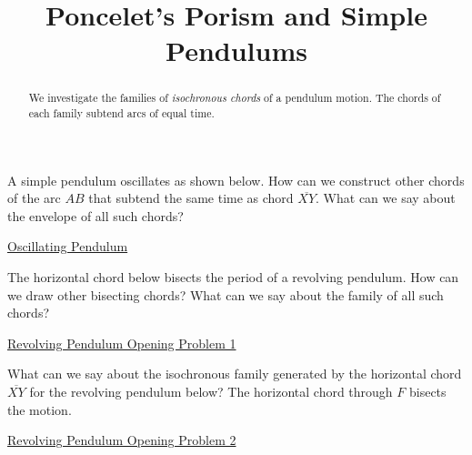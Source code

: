 \documentclass{ximera}
\title{Poncelet's Porism and Simple Pendulums}
\begin{document}
\begin{abstract}
We investigate the families of \emph{isochronous chords} of a pendulum motion. The chords of each family subtend arcs of equal time.
\end{abstract}
\maketitle





\begin{exploration}
A simple pendulum oscillates as shown below. How can we construct other chords of the arc $AB$ that subtend the same time as chord $\overline{XY}$. What can we say about the envelope of all such chords?

\begin{onlineOnly}
    \begin{center}
\end{center}
\end{onlineOnly}

\href{https://www.desmos.com/calculator/pleca0vkjw}{Oscillating Pendulum}

\end{exploration}

\begin{exploration}
The horizontal chord below bisects the period of a revolving pendulum. How can we draw other bisecting chords? What can we say about the family of all such chords?

\begin{onlineOnly}
    \begin{center}
\end{center}
\end{onlineOnly}

\href{https://www.desmos.com/calculator/x5fzsfvxdb}{Revolving Pendulum Opening Problem 1}

\end{exploration}

\begin{exploration}
What can we say about the isochronous family generated by the horizontal chord $\overline{XY}$ for the revolving pendulum below? The horizontal chord through $F$ bisects the motion.

\begin{onlineOnly}
    \begin{center}
\end{center}
\end{onlineOnly}

\href{https://www.desmos.com/calculator/1kyfdn6yyc}{Revolving Pendulum Opening Problem 2}

\end{exploration}
\end{document}
